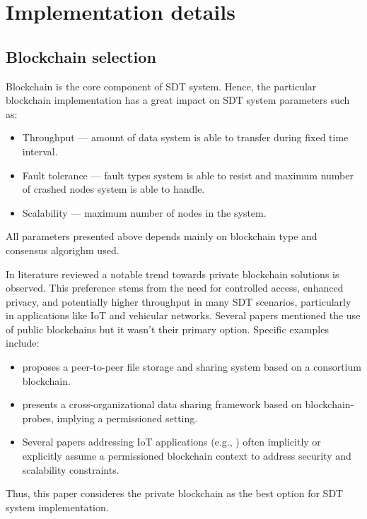 \documentclass[10pt]{llncs}
\begin{document}
\section{Implementation details} \label{implementation_details}

\subsection{Blockchain selection}

Blockchain is the core component of SDT system.
Hence, the particular blockchain implementation has a great impact on SDT system parameters such as:

\begin{itemize}
    \item Throughput --- amount of data system is able to transfer during fixed time interval.
    \item Fault tolerance --- fault types system is able to resist and maximum number of crashed nodes system is able to handle.
    \item Scalability --- maximum number of nodes in the system.
\end{itemize}

All parameters presented above depends mainly on blockchain type and consensus algorighm used.

In literature reviewed a notable trend towards private blockchain solutions is observed.
This preference stems from the need for controlled access, enhanced privacy, and potentially higher throughput in many SDT scenarios, particularly in applications like IoT and vehicular networks. 
Several papers mentioned the use of public blockchains but it wasn't their primary option. 
Specific examples include:

\begin{itemize}
    \item \cite{Peng2023} proposes a peer-to-peer file storage and sharing system based on a consortium blockchain.
    \item \cite{Jia2023} presents a cross-organizational data sharing framework based on blockchain-probes, implying a permissioned setting.
    \item Several papers addressing IoT applications (e.g., \cite{Ai2022,Gupta2022}) often implicitly or explicitly assume a permissioned blockchain context to address security and scalability constraints.
\end{itemize}

Thus, this paper consideres the private blockchain as the best option for SDT system implementation.
\end{document}
